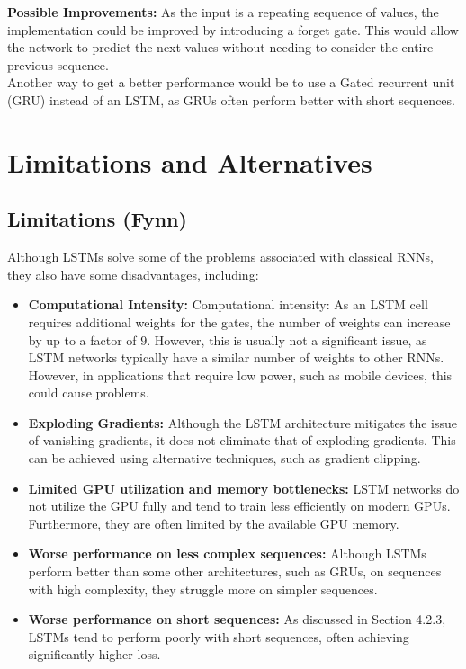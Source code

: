 \documentclass[twoside,a4paper,10pt,DIV=12,BCOR=12mm]{scrartcl}
\begin{document}
\textbf{Possible Improvements:} As the input is a repeating sequence of values, the implementation could be improved by introducing a forget gate. This would allow the network to predict the next values without needing to consider the entire previous sequence.\cite{gers1999forgetgate}\\
Another way to get a better performance would be to use a Gated recurrent unit (GRU) instead of an LSTM, as GRUs often perform better with short sequences.\cite{cahuantzi2023lstmvsgru}
\section{Limitations and Alternatives}

\subsection{Limitations (Fynn)}
Although LSTMs solve some of the problems associated with classical RNNs, they also have some disadvantages, including:
\begin{itemize}
    \item \textbf{Computational Intensity:} Computational intensity: As an LSTM cell requires additional weights for the gates, the number of weights can increase by up to a factor of \begin{math} 9 \end{math}. However, this is usually not a significant issue, as LSTM networks typically have a similar number of weights to other RNNs.\cite{hochreiter1997lstm}\\ However, in applications that require low power, such as mobile devices, this could cause problems. \cite{rizakisFPGAlstm}
    \item \textbf{Exploding Gradients:} Although the LSTM architecture mitigates the issue of vanishing gradients, it does not eliminate that of exploding gradients.\cite{pascanu2013rnntraining} This can be achieved using alternative techniques, such as gradient clipping.\cite{gradient-clipping, pascanu2013rnntraining}
    \item \textbf{Limited GPU utilization and memory bottlenecks:} LSTM networks do not utilize the GPU fully and tend to train less efficiently on modern GPUs. Furthermore, they are often limited by the available GPU memory.\cite{zheng2018scalability, zheng2020scalability}  
    \item \textbf{Worse performance on less complex sequences:} Although LSTMs perform better than some other architectures, such as GRUs, on sequences with high complexity, they struggle more on simpler sequences.\cite{cahuantzi2023lstmvsgru} 
    \item \textbf{Worse performance on short sequences:} As discussed in Section 4.2.3, LSTMs tend to perform poorly with short sequences, often achieving significantly higher loss. \cite{bolboaca2023lstmperformance} 
\end{itemize}
\end{document}
